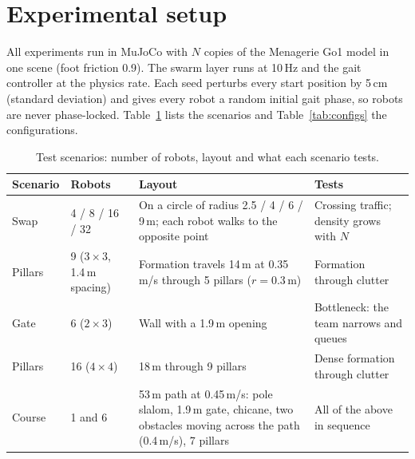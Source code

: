 \documentclass[pdflatex,sn-mathphys-num]{sn-jnl}
\begin{document}
\section{Experimental setup}\label{sec:setup}

All experiments run in MuJoCo \cite{todorov2012mujoco} with $N$ copies of the Menagerie Go1 model
\cite{zakka2022menagerie} in one scene (foot friction 0.9). The swarm layer runs at 10\,Hz and the gait
controller at the physics rate. Each seed perturbs every start position by 5\,cm (standard deviation) and
gives every robot a random initial gait phase, so robots are never phase-locked. Table~\ref{tab:scenarios}
lists the scenarios and Table~\ref{tab:configs} the configurations.

\begin{table}[t]
  \centering
  \caption{Test scenarios: number of robots, layout and what each scenario tests.}
  \label{tab:scenarios}
  \small
  \begin{tabular}{@{}l p{22mm} p{52mm} p{30mm}@{}}
    \toprule
    Scenario & Robots & Layout & Tests \\
    \midrule
    Swap & 4 / 8 / 16 / 32 & On a circle of radius 2.5 / 4 / 6 / 9\,m; each robot walks to the opposite point & Crossing traffic; density grows with $N$ \\
    Pillars & 9 ($3\times3$, 1.4\,m spacing) & Formation travels 14\,m at 0.35\,m/s through 5 pillars ($r = 0.3$\,m) & Formation through clutter \\
    Gate & 6 ($2\times3$) & Wall with a 1.9\,m opening & Bottleneck: the team narrows and queues \\
    Pillars & 16 ($4\times4$) & 18\,m through 9 pillars & Dense formation through clutter \\
    Course & 1 and 6 & 53\,m path at 0.45\,m/s: pole slalom, 1.9\,m gate, chicane, two obstacles moving across the path (0.4\,m/s), 7 pillars & All of the above in sequence \\
    \bottomrule
  \end{tabular}
\end{table}
\end{document}
